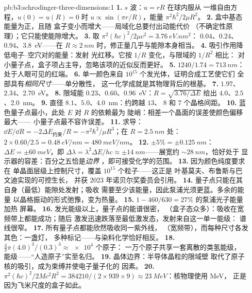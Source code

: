 \begin{solution}{pb:b3:schrodinger-three-dimensions:1}
\textbf{1.} $s$ 波：$u = rR$ 在球内服从
一维自由方程，$u(0) = u(R) = 0$ 时 $u \propto \sin(\pi r/R)$，能量
$\pi^2\hbar^2/2\mu R^2$。
\textbf{2.} 盒中基态能量为正，且随
盒子变小而增大——局域化总要付出动能代价
（不确定性原理）；它只能使能隙增大。
\textbf{3.} 取 $\pi^2(\hbar c)^2/2\mu c^2 = \qty{3.76}{eV.nm^2}$：
$0.04$、$0.24$、$0.94$、\qty{3.8}{eV}——在 $R \approx \qty{2}{nm}$
时，修正量几乎与能隙本身相当。
\textbf{4.} 吸引作用降低电子–空穴对的能量：发射
光红移。它按 $1/R$ 变化，与限域的 $1/R^2$ 相比：
对小量子点，盒子项占主导，忽略该项的近似反而更好。
\textbf{5.} $1240/1.74 = \qty{713}{nm}$：处于人眼可见的红端。
\textbf{6.} 单一颜色来自 $10^{15}$ 个发光体，证明合成工艺使它们
全部具有\emph{相同尺寸}——单分散性，
这一化学成就是其物理背后的根基。
\textbf{7.} $1.97$、$2.34$、\qty{2.70}{eV}。
\textbf{8.} 限域能 $0.23$、$0.60$、\qty{0.96}{eV}：$R =
\sqrt{3.76/\Delta E}$ 给出 $4.0$、$2.5$、\qty{2.0}{nm}。
\textbf{9.} 直径 $8.1$、$5.0$、\qty{4.0}{nm}：约跨越 $13$、
$8$ 和 $7$ 个晶格间距。
\textbf{10.} 蓝色量子点最小，此处 $E$ 对 $R$ 的依赖最为
陡峭：相差一个晶面的误差使颜色偏移最大——
小量子点最不容许误差。
\textbf{11.} 求导：$\dd E/\dd R = -2\Delta E_{\text{约束}}/R
= -\pi^2\hbar^2/\mu R^3$；在 $R = \qty{2.5}{nm}$ 处：$2 \times 0.60/2.5
= \qty{0.48}{eV/nm} = \qty{480}{meV/nm}$。
\textbf{12.} $\pm 5\% = \pm\qty{0.125}{nm}$：$\Delta E = \pm
\qty{60}{meV}$，即 $\Delta\lambda = \lambda^2\Delta E/hc \approx
\pm\qty{14}{nm}$——展宽约 $\sim\qty{28}{nm}$，恰好处于
显示器的容差：百分之五恰是\emph{边界}
，即可接受化学的范围。
\textbf{13.} 因为颜色纯度要求在
单晶面层级上控制尺寸，覆盖 $10^{15}$ 个粒子——这正是
叶基莫夫、布鲁斯与巴文迪实现的可控生长，
并获 2023 年诺贝尔奖委员会引用。
\textbf{14.} 量子点只能在其自身（最低）能隙处发射；吸收
需要至少该能量，因此泵浦光须更蓝。多余的能量
以晶格振动的形式弛豫，变为热量。
\textbf{15.} $1 - 460/630 = 27\%$ 的泵浦光子能量加热
屏幕。
\textbf{16.} 发光能级以上，量子点的能谱很密，
（盒子态众多）：吸收在宽频带上都能成功；随后
激发迅速跌落至最低激发态，发射来自这一单一能级：
谱线很窄。
\textbf{17.} 所有量子点都能欣然吸收同一紫外线，
（宽频带），而每种尺寸各发其色：一盏灯，
多种标记——与染料化学恰好相反。
\textbf{18.} $\tfrac43\pi(4.0)^3/(0.3)^3 \approx \num{e4}$ 个原子：
一万个原子共享一套离散的类氢能级，
能级——“人造原子”实至名归。
\textbf{19.} 晶体边界：半导体晶粒的限域壁
取代了原子核的吸引，成为束缚并使电子量子化的
因素。
\textbf{20.} $\pi^2(\hbar c)^2/2Mc^2R^2 = 384210/(2 \times 939
\times 9) \approx \qty{23}{MeV}$：核物理使用 MeV，
正是因为飞米尺度的盒子如此。

\end{solution}
